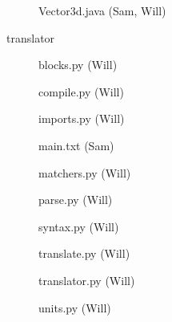 \begin{description}
\begin{description}
\begin{description}
    \item[] Vector3d.java (Sam, Will)
    \end{description}
  \end{description}
\item[] translator
  \begin{description}
  \item[] blocks.py (Will)
  \item[] compile.py (Will)
  \item[] imports.py (Will)
  \item[] main.txt (Sam)
  \item[] matchers.py (Will)
  \item[] parse.py (Will)
  \item[] syntax.py (Will)
  \item[] translate.py (Will)
  \item[] translator.py (Will)
  \item[] units.py (Will)
  \end{description}
\end{description}